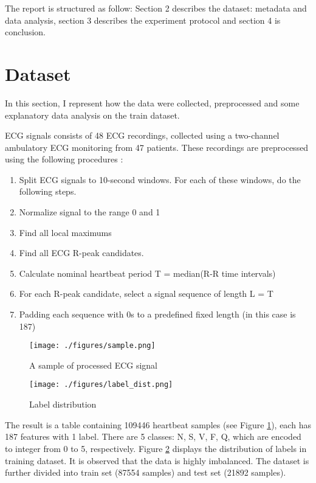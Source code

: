 \documentclass[conference]{IEEEtran}
\begin{document}
	The report is structured as follow: Section 2 describes the dataset: metadata and data analysis, section 3 describes the experiment protocol and section 4 is conclusion. 
	
	 
	\section{Dataset}
	In this section, I represent how the data were collected, preprocessed and some explanatory data analysis on the train dataset. 
	
	ECG signals consists of 48 ECG recordings, collected using a two-channel ambulatory ECG monitoring from 47 patients. These recordings are preprocessed using the following procedures \cite{kachuee}:
	 
	\begin{enumerate}
		\item Split ECG signals to 10-second windows. For each of these windows, do the following steps. 
		\item Normalize signal to the range 0 and 1
		\item Find all local maximums
		\item Find all ECG R-peak candidates. 
		\item Calculate nominal heartbeat period T = median(R-R time intervals)
		\item For each R-peak candidate, select a signal sequence of length L = T
		\item Padding each sequence with 0s to a predefined fixed length (in this case is 187) 
	\end{enumerate}
	
	\begin{figure}
		\centering
		\texttt{[image: ./figures/sample.png]}
		\caption{A sample of processed ECG signal}
		\label{sample}
	\end{figure}
	
	
	\begin{figure}[h]
		\centering
		\texttt{[image: ./figures/label\_dist.png]}
		\caption{Label distribution}
		\label{label_dist}
	\end{figure}
	
	The result is a table containing 109446 heartbeat samples (see Figure \ref{sample}), each has 187 features with 1 label. There are 5 classes: N, S, V, F, Q, which are encoded to integer from 0 to 5, respectively. Figure \ref{label_dist} displays the distribution of labels in training dataset. It is observed that the data is highly imbalanced. The dataset is further divided into train set (87554 samples) and test set (21892 samples).
	
\end{document}
